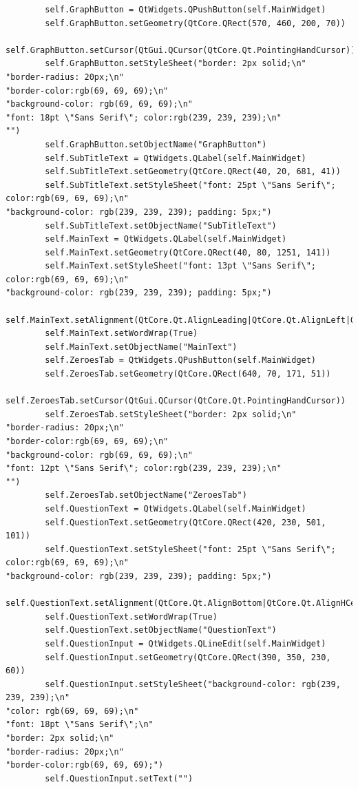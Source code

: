 \documentclass{article}
\begin{document}
\begin{lstlisting}
        self.GraphButton = QtWidgets.QPushButton(self.MainWidget)
        self.GraphButton.setGeometry(QtCore.QRect(570, 460, 200, 70))
        self.GraphButton.setCursor(QtGui.QCursor(QtCore.Qt.PointingHandCursor))
        self.GraphButton.setStyleSheet("border: 2px solid;\n"
"border-radius: 20px;\n"
"border-color:rgb(69, 69, 69);\n"
"background-color: rgb(69, 69, 69);\n"
"font: 18pt \"Sans Serif\"; color:rgb(239, 239, 239);\n"
"")
        self.GraphButton.setObjectName("GraphButton")
        self.SubTitleText = QtWidgets.QLabel(self.MainWidget)
        self.SubTitleText.setGeometry(QtCore.QRect(40, 20, 681, 41))
        self.SubTitleText.setStyleSheet("font: 25pt \"Sans Serif\"; color:rgb(69, 69, 69);\n"
"background-color: rgb(239, 239, 239); padding: 5px;")
        self.SubTitleText.setObjectName("SubTitleText")
        self.MainText = QtWidgets.QLabel(self.MainWidget)
        self.MainText.setGeometry(QtCore.QRect(40, 80, 1251, 141))
        self.MainText.setStyleSheet("font: 13pt \"Sans Serif\"; color:rgb(69, 69, 69);\n"
"background-color: rgb(239, 239, 239); padding: 5px;")
        self.MainText.setAlignment(QtCore.Qt.AlignLeading|QtCore.Qt.AlignLeft|QtCore.Qt.AlignTop)
        self.MainText.setWordWrap(True)
        self.MainText.setObjectName("MainText")
        self.ZeroesTab = QtWidgets.QPushButton(self.MainWidget)
        self.ZeroesTab.setGeometry(QtCore.QRect(640, 70, 171, 51))
        self.ZeroesTab.setCursor(QtGui.QCursor(QtCore.Qt.PointingHandCursor))
        self.ZeroesTab.setStyleSheet("border: 2px solid;\n"
"border-radius: 20px;\n"
"border-color:rgb(69, 69, 69);\n"
"background-color: rgb(69, 69, 69);\n"
"font: 12pt \"Sans Serif\"; color:rgb(239, 239, 239);\n"
"")
        self.ZeroesTab.setObjectName("ZeroesTab")
        self.QuestionText = QtWidgets.QLabel(self.MainWidget)
        self.QuestionText.setGeometry(QtCore.QRect(420, 230, 501, 101))
        self.QuestionText.setStyleSheet("font: 25pt \"Sans Serif\"; color:rgb(69, 69, 69);\n"
"background-color: rgb(239, 239, 239); padding: 5px;")
        self.QuestionText.setAlignment(QtCore.Qt.AlignBottom|QtCore.Qt.AlignHCenter)
        self.QuestionText.setWordWrap(True)
        self.QuestionText.setObjectName("QuestionText")
        self.QuestionInput = QtWidgets.QLineEdit(self.MainWidget)
        self.QuestionInput.setGeometry(QtCore.QRect(390, 350, 230, 60))
        self.QuestionInput.setStyleSheet("background-color: rgb(239, 239, 239);\n"
"color: rgb(69, 69, 69);\n"
"font: 18pt \"Sans Serif\";\n"
"border: 2px solid;\n"
"border-radius: 20px;\n"
"border-color:rgb(69, 69, 69);")
        self.QuestionInput.setText("")

\end{lstlisting}
\end{document}
